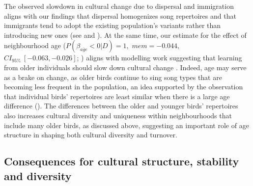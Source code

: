 \documentclass[9pt, onecolumn, twoside, lineno]{gsajnl}
\begin{document}
The observed slowdown in cultural change due to dispersal and immigration aligns with our findings that dispersal homogenizes song repertoires and that immigrants tend to adopt the existing population's variants rather than introducing new ones (see  and ). At the same time, our estimate for the effect of neighbourhood age ($P(\beta_{\overline{age}} < 0 | D) = 1,$ $mem=-0.044,$ $CI_{95\%}~[-0.063, -0.026]$; ) aligns with modelling work suggesting that learning from older individuals should slow down cultural change \autocite{kirby2021}. Indeed, age may serve as a brake on change, as older birds continue to sing song types that are becoming less frequent in the population, an idea supported by the observation that individual birds' repertoires are least similar when there is a large age difference (). The differences between the older and younger birds' repertoires also increases cultural diversity and uniqueness within neighbourhoods that include many older birds, as discussed above, suggesting an important role of age structure in shaping both cultural diversity and turnover.

\subsection{Consequences for cultural structure, stability and diversity}
\end{document}
